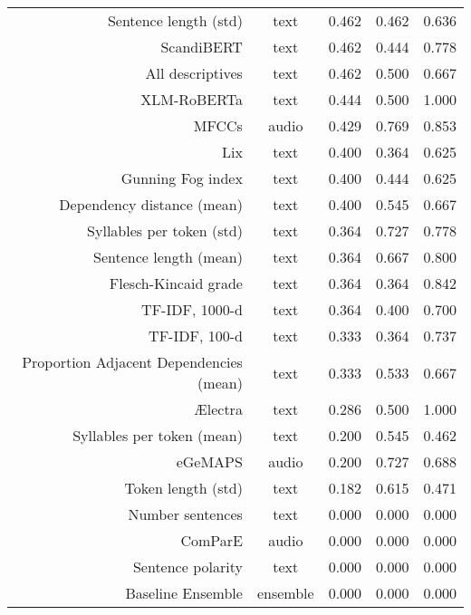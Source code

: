 \begin{tabular}{rc||ccc}
                  Sentence length (std) &     text &    0.462 &      0.462 & 0.636 \\
                             ScandiBERT &     text &    0.462 &      0.444 & 0.778 \\
                       All descriptives &     text &    0.462 &      0.500 & 0.667 \\
                            XLM-RoBERTa &     text &    0.444 &      0.500 & 1.000 \\
                                  MFCCs &    audio &    0.429 &      0.769 & 0.853 \\
                                    Lix &     text &    0.400 &      0.364 & 0.625 \\
                      Gunning Fog index &     text &    0.400 &      0.444 & 0.625 \\
             Dependency distance (mean) &     text &    0.400 &      0.545 & 0.667 \\
              Syllables per token (std) &     text &    0.364 &      0.727 & 0.778 \\
                 Sentence length (mean) &     text &    0.364 &      0.667 & 0.800 \\
                   Flesch-Kincaid grade &     text &    0.364 &      0.364 & 0.842 \\
                         TF-IDF, 1000-d &     text &    0.364 &      0.400 & 0.700 \\
                          TF-IDF, 100-d &     text &    0.333 &      0.364 & 0.737 \\
Proportion Adjacent Dependencies (mean) &     text &    0.333 &      0.533 & 0.667 \\
                                Ælectra &     text &    0.286 &      0.500 & 1.000 \\
             Syllables per token (mean) &     text &    0.200 &      0.545 & 0.462 \\
                                eGeMAPS &    audio &    0.200 &      0.727 & 0.688 \\
                     Token length (std) &     text &    0.182 &      0.615 & 0.471 \\
                       Number sentences &     text &    0.000 &      0.000 & 0.000 \\
                                ComParE &    audio &    0.000 &      0.000 & 0.000 \\
                      Sentence polarity &     text &    0.000 &      0.000 & 0.000 \\
                      Baseline Ensemble & ensemble &    0.000 &      0.000 & 0.000 \\
\bottomrule
\end{tabular}
